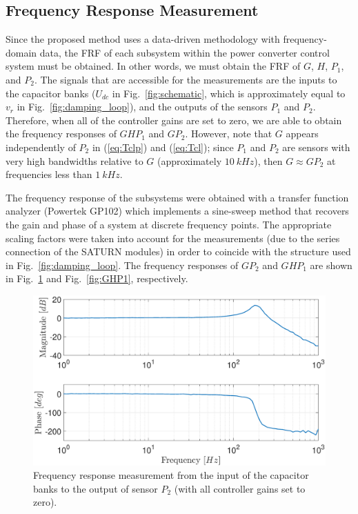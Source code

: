 \documentclass[a4paper, 10pt, conference]{ieeeconf}
\begin{document}
\subsection{Frequency Response Measurement}
Since the proposed method uses a data-driven methodology with frequency-domain data, the FRF of each subsystem within the power converter control system must be obtained. In other words, we must obtain the FRF of $G$, $H$, $P_1$, and $P_2$. The signals that are accessible for the measurements are the inputs to the capacitor banks ($U_{dc}$ in Fig.~\ref{fig:schematic}, which is approximately equal to $v_r$ in Fig.~\ref{fig:damping_loop}), and the outputs of the sensors $P_1$ and $P_2$. Therefore, when all of the controller gains are set to zero, we are able to obtain the frequency responses of $GHP_1$ and $GP_2$. However, note that $G$ appears independently of $P_2$ in (\ref{eq:Tclp}) and (\ref{eq:Tcl}); since $P_1$ and $P_2$ are sensors with very high bandwidths relative to $G$ (approximately $10 \: kHz$), then $G \approx GP_2$  at frequencies less than $1 \: kHz$. 

The frequency response of the subsystems were obtained with a transfer function analyzer (Powertek GP102) which implements a sine-sweep method that recovers the gain and phase of a system at discrete frequency points. The appropriate scaling factors were taken into account for the measurements (due to the series connection of the SATURN modules) in order to coincide with the structure used in Fig.~\ref{fig:damping_loop}. The frequency responses of $GP_2$ and $GHP_1$ are shown in Fig.~\ref{fig:G} and Fig.~\ref{fig:GHP1}, respectively.

\begin{figure}
\centering
\includegraphics[width=\columnwidth]{../pics/G.eps}
\caption{Frequency response measurement from the input of the capacitor banks to the output of sensor $P_2$ (with all controller gains set to zero).}
\label{fig:G}
\end{figure} 
\end{document}
